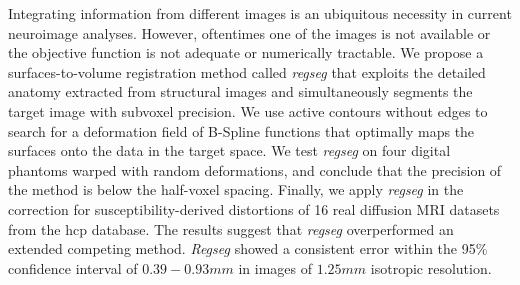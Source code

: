 Integrating information from different images is an ubiquitous necessity
  in current neuroimage analyses.
However, oftentimes one of the images is not available or the objective
  function is not adequate or numerically tractable.
We propose a surfaces-to-volume registration method called \emph{regseg}
  that exploits the detailed anatomy extracted from structural images and
  simultaneously segments the target image with subvoxel precision.
We use active contours without edges to search for a deformation field
  of B-Spline functions that optimally maps the surfaces
  onto the data in the target space.
We test \emph{regseg} on four digital phantoms warped with random deformations,
  and conclude that the precision of the method is below the half-voxel spacing.
Finally, we apply \emph{regseg} in the correction for susceptibility-derived
  distortions of 16 real diffusion MRI datasets from the \acrlong*{hcp}
  database.
The results suggest that \emph{regseg} overperformed an extended competing method.
\emph{Regseg} showed a consistent error within the 95\% confidence interval of
  $0.39-0.93mm$ in images of $1.25mm$ isotropic resolution.

